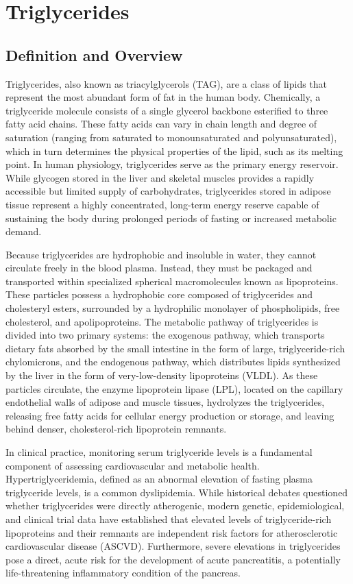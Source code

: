 \chapter{Triglycerides}

\section*{Definition and Overview}
Triglycerides, also known as triacylglycerols (TAG), are a class of lipids that represent the most abundant form of fat in the human body. Chemically, a triglyceride molecule consists of a single glycerol backbone esterified to three fatty acid chains. These fatty acids can vary in chain length and degree of saturation (ranging from saturated to monounsaturated and polyunsaturated), which in turn determines the physical properties of the lipid, such as its melting point. In human physiology, triglycerides serve as the primary energy reservoir. While glycogen stored in the liver and skeletal muscles provides a rapidly accessible but limited supply of carbohydrates, triglycerides stored in adipose tissue represent a highly concentrated, long-term energy reserve capable of sustaining the body during prolonged periods of fasting or increased metabolic demand.

Because triglycerides are hydrophobic and insoluble in water, they cannot circulate freely in the blood plasma. Instead, they must be packaged and transported within specialized spherical macromolecules known as lipoproteins. These particles possess a hydrophobic core composed of triglycerides and cholesteryl esters, surrounded by a hydrophilic monolayer of phospholipids, free cholesterol, and apolipoproteins. The metabolic pathway of triglycerides is divided into two primary systems: the exogenous pathway, which transports dietary fats absorbed by the small intestine in the form of large, triglyceride-rich chylomicrons, and the endogenous pathway, which distributes lipids synthesized by the liver in the form of very-low-density lipoproteins (VLDL). As these particles circulate, the enzyme lipoprotein lipase (LPL), located on the capillary endothelial walls of adipose and muscle tissues, hydrolyzes the triglycerides, releasing free fatty acids for cellular energy production or storage, and leaving behind denser, cholesterol-rich lipoprotein remnants.

In clinical practice, monitoring serum triglyceride levels is a fundamental component of assessing cardiovascular and metabolic health. Hypertriglyceridemia, defined as an abnormal elevation of fasting plasma triglyceride levels, is a common dyslipidemia. While historical debates questioned whether triglycerides were directly atherogenic, modern genetic, epidemiological, and clinical trial data have established that elevated levels of triglyceride-rich lipoproteins and their remnants are independent risk factors for atherosclerotic cardiovascular disease (ASCVD). Furthermore, severe elevations in triglycerides pose a direct, acute risk for the development of acute pancreatitis, a potentially life-threatening inflammatory condition of the pancreas.

